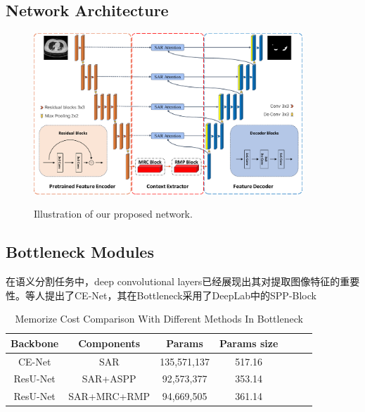 \documentclass{ieeeaccess}
\begin{document}
\subsection{Network Architecture}
\begin{figure}[htbp]
    \xdef\xfigwd{\textwidth}%
    \centering
    \includegraphics[width=0.9\textwidth]{figure/overview.pdf}
    \label{fig:overview}
    \caption{Illustration of our proposed network.}

\end{figure}

\subsection{Bottleneck Modules}
在语义分割任务中，deep convolutional layers已经展现出其对提取图像特征的重要性。等人提出了CE-Net\cite{cenet}，其在Bottleneck采用了DeepLab中的SPP-Block

\begin{table}[htbp]
  \vspace{-2mm}
  \begin{center}\small
  \label{param-table}
  \begin{tabular}{ccccccc}
    
  \toprule
  Backbone & Components & Params & Params size \\
  \midrule
    CE-Net & SAR & 135,571,137 & 517.16 \\
    ResU-Net & SAR+ASPP    & 92,573,377 & 353.14  \\
    ResU-Net & SAR+MRC+RMP & 94,669,505 & 361.14  \\
\bottomrule    
  \end{tabular}
  \caption{Memorize Cost Comparison With Different Methods In Bottleneck}
\end{center}
  \vspace{-4mm}
\end{table}
\end{document}
